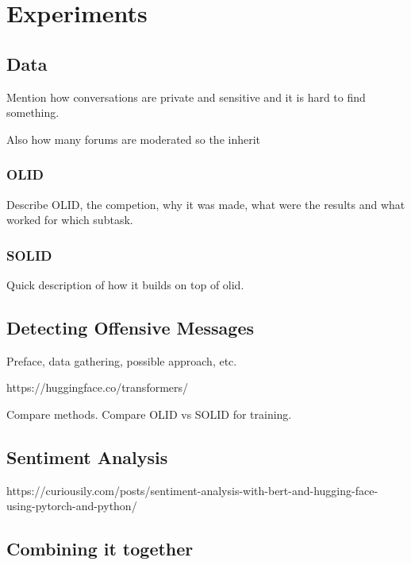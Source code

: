 \chapter{Experiments}
\label{chap:experiments}

\section{Data}

Mention how conversations are private and sensitive and it is hard to find something.

Also how many forums are moderated so the inherit 

\subsection{OLID}

Describe OLID, the competion, why it was made, what were the results and what worked for which subtask.

\subsection{SOLID}

Quick description of how it builds on top of olid.

\section{Detecting Offensive Messages}

Preface, data gathering, possible approach, etc.

https://huggingface.co/transformers/

Compare methods. Compare OLID vs SOLID for training.

\section{Sentiment Analysis}

https://curiousily.com/posts/sentiment-analysis-with-bert-and-hugging-face-using-pytorch-and-python/

\section{Combining it together}


